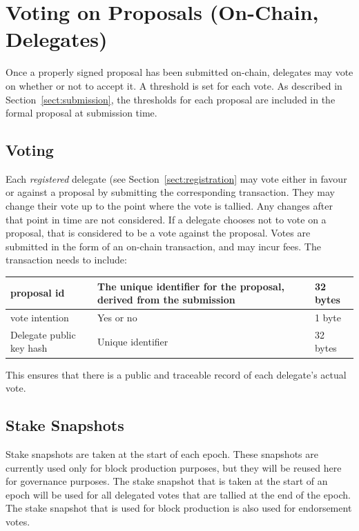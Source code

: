 \newpage
\section{Voting on Proposals (On-Chain, Delegates)}
\label{sect:voting}

Once a properly signed proposal has been submitted on-chain, delegates may vote on whether or not to accept it.  A threshold is set for each vote.
As described in Section~\ref{sect:submission}, the thresholds for each proposal are included in the formal proposal at submission time.

\subsection{Voting}

Each \emph{registered} delegate (see Section~\ref{sect:registration} may vote either in favour or against a proposal by submitting the corresponding transaction.  They may change their vote up to the point
where the vote is tallied.  Any changes after that point in time are not considered.  If a delegate chooses not to vote on a proposal, that is considered to be
a vote against the proposal.  Votes are submitted in the form of an on-chain transaction, and may incur fees.  The transaction needs to include:

\begin{tabular}{||l|p{3in}|l||}
  \hline\hline
  proposal id & The unique identifier for the proposal, derived from the submission & 32 bytes
  \\\hline
  vote intention & Yes or no & 1 byte
  \\\hline
  Delegate public key hash & Unique identifier & 32 bytes
  \\\hline
  \hline
\end{tabular}

This ensures that there is a public and traceable record of each delegate's actual vote.


\subsection{Stake Snapshots}

Stake snapshots are taken at the start of each epoch.  These snapshots are currently used only for block production purposes, but they will be reused here for governance purposes.
The stake snapshot that is taken at the start of an epoch will be used for all delegated votes that are tallied at the end of the epoch.
The stake snapshot that is used for block production is also used for endorsement votes.

